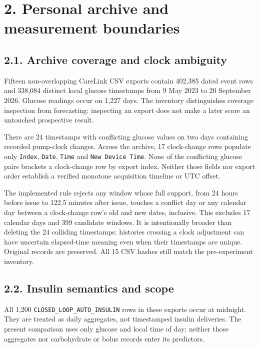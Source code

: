 \documentclass[11pt,letterpaper]{article}
\begin{document}
\section{2. Personal archive and measurement
boundaries}\label{personal-archive-and-measurement-boundaries}

\subsection{2.1. Archive coverage and clock
ambiguity}\label{archive-coverage-and-clock-ambiguity}

Fifteen non-overlapping CareLink CSV exports contain 402,385 dated event
rows and 338,084 distinct local glucose timestamps from 9 May 2023 to 20
September 2026. Glucose readings occur on 1,227 days. The inventory
distinguishes coverage inspection from forecasting: inspecting an export
does not make a later score an untouched prospective result.

There are 24 timestamps with conflicting glucose values on two days
containing recorded pump-clock changes. Across the archive, 17
clock-change rows populate only \texttt{Index}, \texttt{Date},
\texttt{Time} and \texttt{New\ Device\ Time}. None of the conflicting
glucose pairs brackets a clock-change row by export index. Neither those
fields nor export order establish a verified monotone acquisition
timeline or UTC offset.

The implemented rule rejects any window whose full support, from 24
hours before issue to 122.5 minutes after issue, touches a conflict day
or any calendar day between a clock-change row's old and new dates,
inclusive. This excludes 17 calendar days and 399 candidate windows. It
is intentionally broader than deleting the 24 colliding timestamps:
histories crossing a clock adjustment can have uncertain elapsed-time
meaning even when their timestamps are unique. Original records are
preserved. All 15 CSV hashes still match the pre-experiment inventory.

\subsection{2.2. Insulin semantics and
scope}\label{insulin-semantics-and-scope}

All 1,200 {\ttfamily\nolinkurl{CLOSED_LOOP_AUTO_INSULIN}} rows in these exports
occur at midnight. They are treated as daily aggregates, not timestamped
insulin deliveries. The present comparison uses only glucose and local
time of day; neither those aggregates nor carbohydrate or bolus records
enter its predictors.
\end{document}
